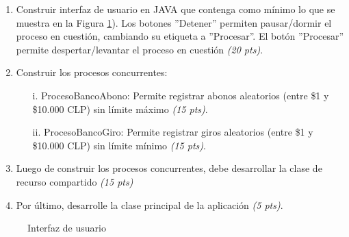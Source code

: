 \documentclass[10pt]{article}
\begin{document}
\begin{enumerate}
    \begin{enumerate}[label=(\alph*)]
		\item Construir interfaz de usuario en JAVA que contenga como m\'inimo lo que se muestra en la Figura \ref{fig:graf-user-mt}). Los botones ''Detener'' permiten pausar/dormir el proceso en cuesti\'on, cambiando su etiqueta a ''Procesar''. El bot\'on ''Procesar'' permite despertar/levantar el proceso en cuesti\'on \emph{(20 pts)}.
		\item Construir los procesos concurrentes:
		\begin{enumerate}[label=(\alph*)]
			\item[i.] ProcesoBancoAbono: Permite registrar abonos aleatorios (entre \$1 y \$10.000 CLP) sin l\'imite m\'aximo \emph{(15 pts)}.
			\item[ii.] ProcesoBancoGiro: Permite registrar giros aleatorios (entre \$1 y \$10.000 CLP) sin l\'imite m\'inimo \emph{(15 pts)}.
		\end{enumerate}
		\item Luego de construir los procesos concurrentes, debe desarrollar la clase de recurso compartido \emph{(15 pts)}
		\item Por \'ultimo, desarrolle la clase principal de la aplicaci\'on \emph{(5 pts)}.
	\end{enumerate}

	\begin{figure}[h]
        \begin{center}
            \caption{Interfaz de usuario}\label{fig:graf-user-mt}
        \end{center}
    \end{figure}
	\end{enumerate}
\end{document}
